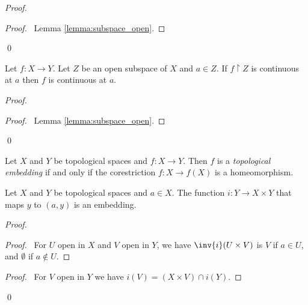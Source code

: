 \begin{proof}
    \pf
    \begin{proof}
        \pf\ Lemma \ref{lemma:subspace_open}.
    \end{proof}
    \qed
\end{proof}

\begin{lemma}
    \label{lemma:continuous_open_subspace}
    Let $f : X \rightarrow Y$. Let $Z$ be an open subspace of $X$ and $a \in Z$. If $f \restriction Z$ is continuous at $a$ then $f$ is continuous at $a$.
\end{lemma}

\begin{proof}
    \pf
    \begin{proof}
        \pf\ Lemma \ref{lemma:subspace_open}.
    \end{proof}
    \qed
\end{proof}

\begin{definition}
    Let $X$ and $Y$ be topological spaces and $f : X \rightarrow Y$. Then $f$ is a \emph{topological
    embedding} if and only if the corestriction $f : X \rightarrow f(X)$ is a homeomorphism.
\end{definition}

\begin{proposition}
    \label{proposition:embedding_product}
    Let $X$ and $Y$ be topological spaces and $a \in X$. The function $i : Y \rightarrow X \times Y$ that maps $y$ to $(a,y)$ is an embedding.
\end{proposition}

\begin{proof}
    \pf
    \begin{proof}
        \pf\ For $U$ open in $X$ and $V$ open in $Y$, we have $\inv{i}(U \times V)$ is $V$ if $a \in U$, and $\emptyset$ if $a \notin U$.
    \end{proof}
    \begin{proof}
        \pf\ For $V$ open in $Y$ we have $i(V) = (X \times V) \cap i(Y)$.
    \end{proof}
    \qed
\end{proof}

